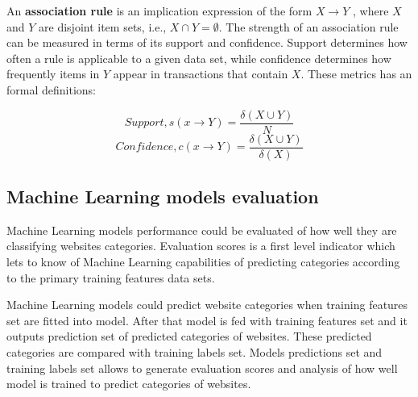 An \textbf{association rule} \cite{BIB12} is an implication expression of the form $X \rightarrow Y$ , where $X$ and $Y$ are disjoint item sets, i.e., $X ∩ Y = ∅$. The strength of an association rule can be measured in terms of its support and confidence. Support determines how often a rule is applicable to a given data set, while confidence determines how frequently items in $Y$ appear in transactions that contain $X$. These metrics has an formal definitions:

\begin{equation}
    Support, s(x \rightarrow Y) = \frac{\delta(X \cup Y)}{N}
\end{equation}
\begin{equation}
    Confidence, c(x \rightarrow Y) = \frac{\delta(X \cup Y)}{\delta(X)}
\end{equation}

\subsection{Machine Learning models evaluation}
Machine Learning models performance could be evaluated of how well they are classifying websites categories. Evaluation scores is a first level indicator which lets to know of Machine Learning capabilities of predicting categories according to the primary training features data sets.

Machine Learning models could predict website categories when training features set are fitted into model. After that model is fed with training features set and it outputs prediction set of predicted categories of websites. These predicted categories are compared with training labels set. Models predictions set and training labels set allows to generate evaluation scores and analysis of how well model is trained to predict categories of websites. 

